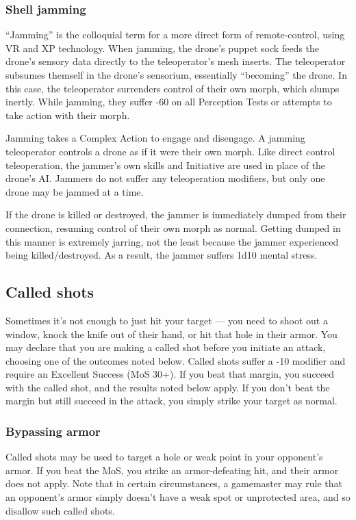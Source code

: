 \subsubsection{Shell jamming}

``Jamming'' is the colloquial term for a more direct form of remote-control, using VR and XP technology. When jamming, the drone’s puppet sock feeds the drone’s sensory data directly to the teleoperator’s mesh inserts. The teleoperator subsumes themself in the drone’s sensorium, essentially ``becoming'' the drone. In this case, the teleoperator surrenders control of their own morph, which slumps inertly. While jamming, they suffer -60 on all Perception Tests or attempts to take action with their morph.

Jamming takes a Complex Action to engage and disengage. A jamming teleoperator controls a drone as if it were their own morph. Like direct control teleoperation, the jammer’s own skills and Initiative are used in place of the drone’s AI. Jammers do not suffer any teleoperation modifiers, but only one drone may be jammed at a time.

If the drone is killed or destroyed, the jammer is immediately dumped from their connection, resuming control of their own morph as normal. Getting dumped in this manner is extremely jarring, not the least because the jammer experienced being killed/destroyed. As a result, the jammer suffers 1d10 mental stress.


\subsection{Called shots}
\label{sec:called-shots}

Sometimes it’s not enough to just hit your target --- you need to shoot out a window, knock the knife out of their hand, or hit that hole in their armor. You may declare that you are making a called shot before you initiate an attack, choosing one of the outcomes noted below. Called shots suffer a -10 modifier and require an Excellent Success (MoS 30+). If you beat that margin, you succeed with the called shot, and the results noted below apply. If you don’t beat the margin but still succeed in the attack, you simply strike your target as normal.

\subsubsection{Bypassing armor}

Called shots may be used to target a hole or weak point in your opponent’s armor. If you beat the MoS, you strike an armor-defeating hit, and their armor does not apply. Note that in certain circumstances, a gamemaster may rule that an opponent’s armor simply doesn’t have a weak spot or unprotected area, and so disallow such called shots.

